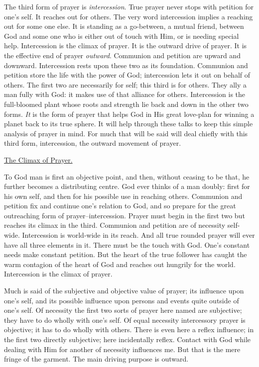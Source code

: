 The third form of prayer is \textit{intercession}. True prayer never stops with
petition for one's self. It reaches out for others. The very word
intercession implies a reaching out for some one else. It is standing as a
go-between, a mutual friend, between God and some one who is either out of
touch with Him, or is needing special help. Intercession is the climax of
prayer. It is the outward drive of prayer. It is the effective end of
prayer \textit{outward}. Communion and petition are upward and downward.
Intercession rests upon these two as its foundation. Communion and
petition store the life with the power of God; intercession lets it out on
behalf of others. The first two are necessarily for self; this third is
for others. They ally a man fully with God: it makes use of that alliance
for others. Intercession is the full-bloomed plant whose roots and
strength lie back and down in the other two forms. \textit{It} is the form of
prayer that helps God in His great love-plan for winning a planet back to
its true sphere. It will help through these talks to keep this simple
analysis of prayer in mind. For much that will be said will deal chiefly
with this third form, intercession, the outward movement of prayer.



\underline{The Climax of Prayer.}


To God man is first an objective point, and then, without ceasing to be
that, he further becomes a distributing centre. God ever thinks of a man
doubly: first for his own self, and then for his possible use in reaching
others. Communion and petition fix and continue one's relation to God, and
so prepare for the great outreaching form of prayer--intercession. Prayer
must begin in the first two but reaches its climax in the third. Communion
and petition are of necessity self-wide. Intercession is world-wide in its
reach. And all true rounded prayer will ever have all three elements in
it. There must be the touch with God. One's constant needs make constant
petition. But the heart of the true follower has caught the warm contagion
of the heart of God and reaches out hungrily for the world. Intercession
is the climax of prayer.

Much is said of the subjective and objective value of prayer; its
influence upon one's self, and its possible influence upon persons and
events quite outside of one's self. Of necessity the first two sorts of
prayer here named are subjective; they have to do wholly with one's self.
Of equal necessity intercessory prayer is objective; it has to do wholly
with others. There is even here a reflex influence; in the first two
directly subjective; here incidentally reflex. Contact with God while
dealing with Him for another of necessity influences me. But that is the
mere fringe of the garment. The main driving purpose is outward.

